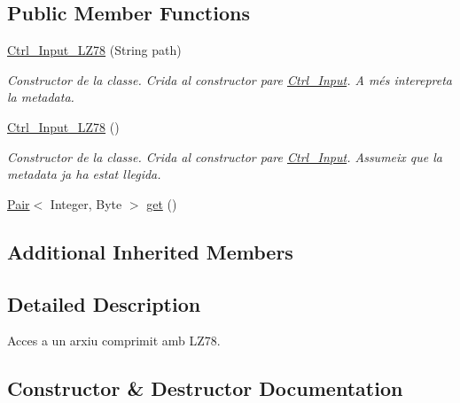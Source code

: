 \subsection*{Public Member Functions}
\begin{DoxyCompactItemize}
\item 
\hyperlink{classpersistencia_1_1input_1_1Ctrl__Input__LZ78_a3629302a8c1eb2b0c7367ad0ea542780}{Ctrl\+\_\+\+Input\+\_\+\+L\+Z78} (String path)
\begin{DoxyCompactList}\small\item\em Constructor de la classe. Crida al constructor pare \hyperlink{classpersistencia_1_1input_1_1Ctrl__Input}{Ctrl\+\_\+\+Input}. A més interepreta la metadata. \end{DoxyCompactList}\item 
\hyperlink{classpersistencia_1_1input_1_1Ctrl__Input__LZ78_acd6dce5cd53ccb3dd2d66d94ca1c3f58}{Ctrl\+\_\+\+Input\+\_\+\+L\+Z78} ()
\begin{DoxyCompactList}\small\item\em Constructor de la classe. Crida al constructor pare \hyperlink{classpersistencia_1_1input_1_1Ctrl__Input}{Ctrl\+\_\+\+Input}. Assumeix que la metadata ja ha estat llegida. \end{DoxyCompactList}\item 
\hyperlink{classdomini_1_1utils_1_1Pair}{Pair}$<$ Integer, Byte $>$ \hyperlink{classpersistencia_1_1input_1_1Ctrl__Input__LZ78_ae09535962f284be3a76369845c15b78c}{get} ()
\end{DoxyCompactItemize}
\subsection*{Additional Inherited Members}


\subsection{Detailed Description}
Acces a un arxiu comprimit amb L\+Z78. 

\subsection{Constructor \& Destructor Documentation}
\mbox{\label{classpersistencia_1_1input_1_1Ctrl__Input__LZ78_a3629302a8c1eb2b0c7367ad0ea542780}} 
